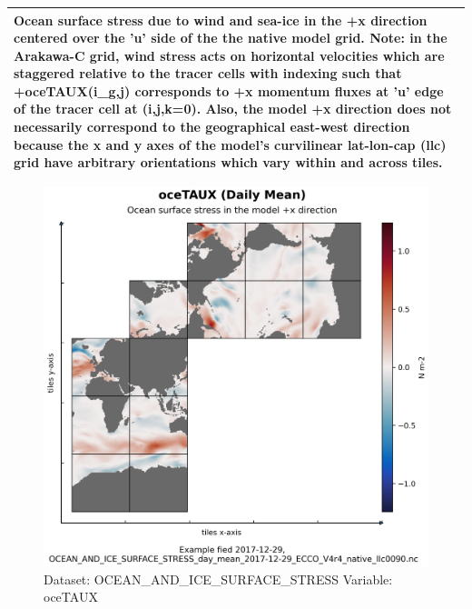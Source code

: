 \begin{longtable}{|m{}|m{}|m{}|m{}|}
\multicolumn{4}{|p{1\textwidth}|}{Ocean surface stress due to wind and sea-ice in the +x direction centered over the 'u' side of the the native model grid. Note: in the Arakawa-C grid, wind stress acts on horizontal velocities which are staggered relative to the tracer cells with indexing such that +oceTAUX(i\_g,j) corresponds to +x momentum fluxes at 'u' edge of the tracer cell at (i,j,k=0). Also, the model +x direction does not necessarily correspond to the geographical east-west direction because the x and y axes of the model's curvilinear lat-lon-cap (llc) grid have arbitrary orientations which vary within and across tiles.} \\ \hline
\end{longtable}

\begin{figure}[H]
\centering
\includegraphics[scale=0.55]{../images/plots/native_plots/Ocean_and_Sea-Ice_Surface_Stress/oceTAUX.png}
\caption{Dataset: OCEAN\_AND\_ICE\_SURFACE\_STRESS Variable: oceTAUX}
\label{tab:table-OCEAN_AND_ICE_SURFACE_STRESS_oceTAUX-Plot}
\end{figure}
\pagebreak
